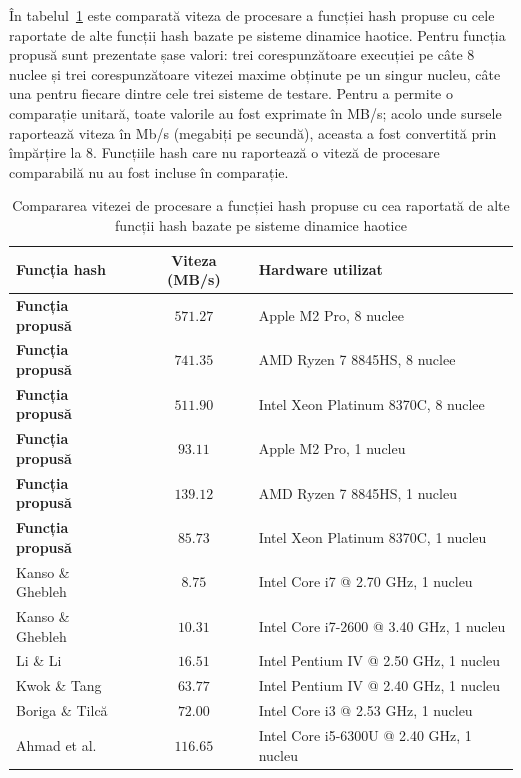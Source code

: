 În tabelul~\ref{tab:comparatie-viteza} este comparată viteza de procesare a funcției hash propuse cu cele raportate de alte funcții hash bazate pe sisteme dinamice haotice.
Pentru funcția propusă sunt prezentate șase valori: trei corespunzătoare execuției pe câte 8 nuclee și trei corespunzătoare vitezei maxime obținute pe un singur nucleu, câte una pentru fiecare dintre cele trei sisteme de testare.
Pentru a permite o comparație unitară, toate valorile au fost exprimate în MB/s; acolo unde sursele raportează viteza în Mb/s (megabiți pe secundă), aceasta a fost convertită prin împărțire la 8.
Funcțiile hash care nu raportează o viteză de procesare comparabilă nu au fost incluse în comparație.

\begin{table}[!htbp]
    \centering
    \small
    \begin{tabular}{|l|c|l|}
        \hline
        \textbf{Funcția hash} & \textbf{Viteza (MB/s)} & \textbf{Hardware utilizat} \\
        \hline
        \textbf{Funcția propusă} & $571.27$ & Apple M2 Pro, 8 nuclee \\
        \hline
        \textbf{Funcția propusă} & $741.35$ & AMD Ryzen 7 8845HS, 8 nuclee \\
        \hline
        \textbf{Funcția propusă} & $511.90$ & Intel Xeon Platinum 8370C, 8 nuclee \\
        \hline
        \textbf{Funcția propusă} & $93.11$ & Apple M2 Pro, 1 nucleu \\
        \hline
        \textbf{Funcția propusă} & $139.12$ & AMD Ryzen 7 8845HS, 1 nucleu \\
        \hline
        \textbf{Funcția propusă} & $85.73$ & Intel Xeon Platinum 8370C, 1 nucleu \\
        \hline
        Kanso \& Ghebleh~\cite{kanso2013} & $8.75$ & Intel Core i7 @ 2.70 GHz, 1 nucleu \\
        \hline
        Kanso \& Ghebleh~\cite{kanso2015} & $10.31$ & Intel Core i7-2600 @ 3.40 GHz, 1 nucleu \\
        \hline
        Li \& Li~\cite{li2016} & $16.51$ & Intel Pentium IV @ 2.50 GHz, 1 nucleu \\
        \hline
        Kwok \& Tang~\cite{kwok2005} & $63.77$ & Intel Pentium IV @ 2.40 GHz, 1 nucleu \\
        \hline
        Boriga \& Tilcă~\cite{boriga2017} & $72.00$ & Intel Core i3 @ 2.53 GHz, 1 nucleu \\
        \hline
        Ahmad et al.~\cite{ahmad2017} & $116.65$ & Intel Core i5-6300U @ 2.40 GHz, 1 nucleu \\
        \hline
    \end{tabular}
    \caption{Compararea vitezei de procesare a funcției hash propuse cu cea raportată de alte funcții hash bazate pe sisteme dinamice haotice}
    \label{tab:comparatie-viteza}
\end{table}

